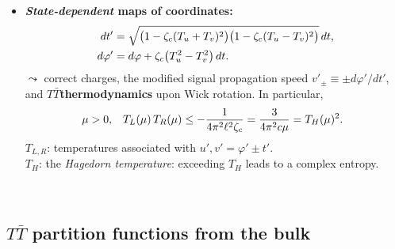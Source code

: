 \documentclass[10pt]{article}
\newcommand{\citations}[1]{{\footnotesize#1\par}}
\newcommand{\TTbar}{\texorpdfstring{\ensuremath{T\bar{T}}}{TTbar}\xspace}
\begin{document}
\begin{multicols}{3}
\begin{itemize}
\columnbreak

\vspace*{-8\baselineskip}

	\item \textbf{\textit{State-dependent} maps of \mbox{coordinates}:}
	\begin{align}
		dt' &= \sqrt{ \big(1 - \zeta_c (T_u+T_v)^2 \big) \big(1 - \zeta_c (T_u-T_v)^2 \big) } \, dt, \notag \\
		 d\varphi' &= d\varphi + \zeta_c \big( T_u^2 - T_v^2 \big)\,dt.
	\label{eq:state_dependent_map}
	\end{align}
	$\leadsto$ correct charges, the modified signal propagation speed $v'_{\pm} \equiv \pm {d\varphi'}/{dt'}$, and \TTbar \textbf{thermodynamics} upon Wick rotation. In particular,
	\begin{equation*}
	\hspace{-.5em} \mu > 0,\ \ \,
		T_L(\mu)\,T_R(\mu) \le - \frac{1}{4\pi^2 \ell^2 \zeta_c} = \frac{3}{4\pi^2c\mu} = T_H(\mu)^2.
	\end{equation*}
	$T_{L,R}$: temperatures associated with $u',v' = \varphi' \pm t'$.\\
	$T_H$: the \textit{Hagedorn temperature}: exceeding $T_H$ leads to a complex entropy.

\begin{flushright}
\vspace{-.5\baselineskip}
\citations{
\textcite{Giveon:2017nie}\\
\textcite{Apolo:2019zai}
}
\vspace{-.8\baselineskip}
\end{flushright}

\end{itemize}

\subsection*{\TTbar partition functions from the bulk} \label{se:partitionfunction}


\end{multicols}
\end{document}
